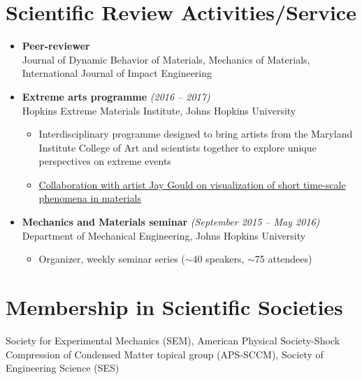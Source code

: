 \documentclass[a4paper,10pt, oneside]{article}
\begin{document}
	\section*{{Scientific Review Activities/Service}}
	\begin{itemize}[wide, labelwidth=!, labelindent=-1em]
		\item[] \textbf{Peer-reviewer} \\
		Journal of Dynamic Behavior of Materials, Mechanics of Materials, International Journal of Impact Engineering
		\vspace*{0.5em}
		\item[]\textbf{Extreme arts programme} \hfill \textit{(2016 -- 2017)} \\
		Hopkins Extreme Materials Institute, Johns Hopkins University
		\begin{itemize}[wide, labelwidth=!, labelindent=0em]
			\item Interdisciplinary programme designed to bring artists from the Maryland Institute College of Art and scientists together to explore unique perspectives on extreme events
			\item \href{https://www.youtube.com/watch?v=SQUqKc2duXA&feature=youtu.be&ab_channel=HEMI-HopkinsExtremeMaterialsInstitute}{Collaboration with artist Jay Gould on visualization of short time-scale phenomena in materials}
		\end{itemize}
		\vspace*{0.5em}
		\item[]\textbf{Mechanics and Materials seminar} \hfill \textit{(September 2015 -- May 2016)} \\
		Department of Mechanical Engineering, Johns Hopkins University
		\begin{itemize}[wide, labelwidth=!, labelindent=0em]
			\item Organizer, weekly seminar series ($\sim$40 speakers, $\sim$75 attendees)
		\end{itemize}
	\end{itemize}
	
	\section*{{Membership in Scientific Societies}}
	Society for Experimental Mechanics (SEM), American Physical Society-Shock Compression of Condensed Matter topical group (APS-SCCM), Society of Engineering Science (SES) 
	
\end{document}
